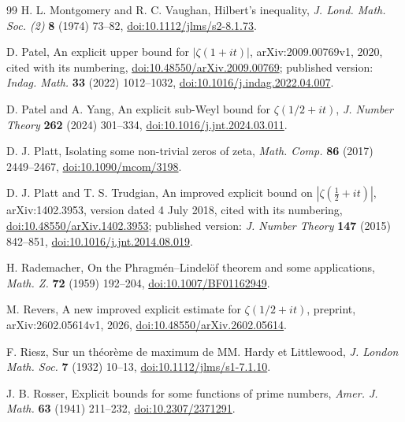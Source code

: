 \documentclass[11pt,a4paper]{article}
\numberwithin{equation}{section}
\theoremstyle{definition}
\theoremstyle{remark}
\begin{document}
\begin{thebibliography}{99}
 H. L. Montgomery and R. C. Vaughan, Hilbert's inequality, \textit{J. Lond. Math. Soc. (2)} \textbf{8} (1974) 73--82, \href{https://doi.org/10.1112/jlms/s2-8.1.73}{doi:10.1112/jlms/s2-8.1.73}.

 D. Patel, An explicit upper bound for $|\zeta(1+it)|$, arXiv:2009.00769v1, 2020, cited with its numbering, \href{https://doi.org/10.48550/arXiv.2009.00769}{doi:10.48550/arXiv.2009.00769}; published version: \textit{Indag. Math.} \textbf{33} (2022) 1012--1032, \href{https://doi.org/10.1016/j.indag.2022.04.007}{doi:10.1016/j.indag.2022.04.007}.

 D. Patel and A. Yang, An explicit sub-Weyl bound for $\zeta(1/2+it)$, \textit{J. Number Theory} \textbf{262} (2024) 301--334, \href{https://doi.org/10.1016/j.jnt.2024.03.011}{doi:10.1016/j.jnt.2024.03.011}.

 D. J. Platt, Isolating some non-trivial zeros of zeta, \textit{Math. Comp.} \textbf{86} (2017) 2449--2467, \href{https://doi.org/10.1090/mcom/3198}{doi:10.1090/mcom/3198}.

 D. J. Platt and T. S. Trudgian, An improved explicit bound on $|\zeta(\frac12+it)|$, arXiv:1402.3953, version dated 4 July 2018, cited with its numbering, \href{https://doi.org/10.48550/arXiv.1402.3953}{doi:10.48550/arXiv.1402.3953}; published version: \textit{J. Number Theory} \textbf{147} (2015) 842--851, \href{https://doi.org/10.1016/j.jnt.2014.08.019}{doi:10.1016/j.jnt.2014.08.019}.

 H. Rademacher, On the Phragm\'en--Lindel\"of theorem and some applications, \textit{Math. Z.} \textbf{72} (1959) 192--204, \href{https://doi.org/10.1007/BF01162949}{doi:10.1007/BF01162949}.

 M. Revers, A new improved explicit estimate for $\zeta(1/2+it)$, preprint, arXiv:2602.05614v1, 2026, \href{https://doi.org/10.48550/arXiv.2602.05614}{doi:10.48550/arXiv.2602.05614}.

 F. Riesz, Sur un th\'eor\`eme de maximum de MM. Hardy et Littlewood, \textit{J. London Math. Soc.} \textbf{7} (1932) 10--13, \href{https://doi.org/10.1112/jlms/s1-7.1.10}{doi:10.1112/jlms/s1-7.1.10}.

 J. B. Rosser, Explicit bounds for some functions of prime numbers, \textit{Amer. J. Math.} \textbf{63} (1941) 211--232, \href{https://doi.org/10.2307/2371291}{doi:10.2307/2371291}.


\end{thebibliography}
\end{document}
